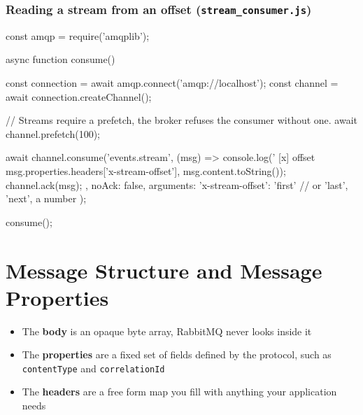 \documentclass[11pt,a4paper]{article}
\begin{document}
\subsubsection*{Reading a stream from an offset (\texttt{stream\_consumer.js})}
\begin{js}
const amqp = require('amqplib');

async function consume() {
    const connection = await amqp.connect('amqp://localhost');
    const channel = await connection.createChannel();

    // Streams require a prefetch, the broker refuses the consumer without one.
    await channel.prefetch(100);

    await channel.consume('events.stream', (msg) => {
        console.log(' [x] offset %
            msg.properties.headers['x-stream-offset'],
            msg.content.toString());
        channel.ack(msg);
    }, {
        noAck: false,
        arguments: { 'x-stream-offset': 'first' }  // or 'last', 'next', a number
    });
}
consume();
\end{js}

\newpage
\section{Message Structure and Message Properties}



\begin{itemize}\itemsep2pt
  \item The \textbf{body} is an opaque byte array, RabbitMQ never looks inside it
  \item The \textbf{properties} are a fixed set of fields defined by the protocol, such as
        \lstinline|contentType| and \lstinline|correlationId|
  \item The \textbf{headers} are a free form map you fill with anything your application
        needs
\end{itemize}

\end{document}
